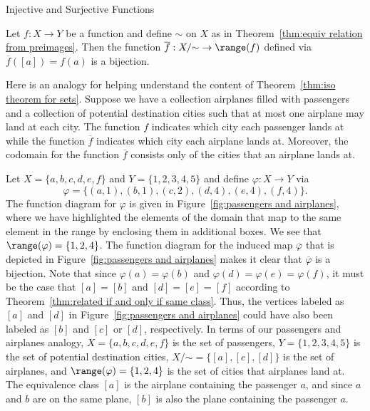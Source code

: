 \begin{section}{Injective and Surjective Functions}
\begin{theorem}\label{thm:iso theorem for sets}
Let $f:X\to Y$ be a function and define $\sim$ on $X$ as in Theorem~\ref{thm:equiv relation from preimages}. 
Then the function $\overline{f}:X/\mathord\sim\to \range(f)$ defined via $\overline{f}([a]) = f(a)$ is a bijection.
\end{theorem}

Here is an analogy for helping understand the content of Theorem~\ref{thm:iso theorem for sets}.  Suppose we have a collection airplanes filled with passengers and a collection of potential destination cities such that at most one airplane may land at each city.  The function $f$ indicates which city each passenger lands at while the function $\overline{f}$ indicates which city each airplane lands at.  Moreover, the codomain for the function $\overline{f}$ consists only of the cities that an airplane lands at.

\begin{example}
Let $X=\{a,b,c,d,e,f\}$ and $Y=\{1,2,3,4,5\}$ and define $\varphi:X\to Y$ via
\[
\varphi=\{(a,1),(b,1),(c,2),(d,4),(e,4),(f,4)\}.
\]
The function diagram for $\varphi$ is given in Figure~\ref{fig:passengers and airplanes}, where we have highlighted the elements of the domain that map to the same element in the range by enclosing them in additional boxes.  We see that $\range(\varphi)=\{1,2,4\}$. The function diagram for the induced map $\overline{\varphi}$ that is depicted in Figure~\ref{fig:passengers and airplanes} makes it clear that $\overline{\varphi}$ is a bijection.  Note that since $\varphi(a)=\varphi(b)$ and $\varphi(d)=\varphi(e)=\varphi(f)$, it must be the case that $[a]=[b]$ and $[d]=[e]=[f]$ according to Theorem~\ref{thm:related if and only if same class}.  Thus, the vertices labeled as $[a]$ and $[d]$ in Figure~\ref{fig:passengers and airplanes} could have also been labeled as $[b]$ and $[c]$ or $[d]$, respectively.  In terms of our passengers and airplanes analogy, $X=\{a,b,c,d,e,f\}$ is the set of passengers, $Y=\{1,2,3,4,5\}$ is the set of potential destination cities, $X/\mathord\sim=\{[a],[c],[d]\}$ is the set of airplanes, and $\range(\varphi)=\{1,2,4\}$ is the set of cities that airplanes land at.  The equivalence class $[a]$ is the airplane containing the passenger $a$, and since $a$ and $b$ are on the same plane, $[b]$ is also the plane containing the passenger $a$.
\end{example}


\end{section}
